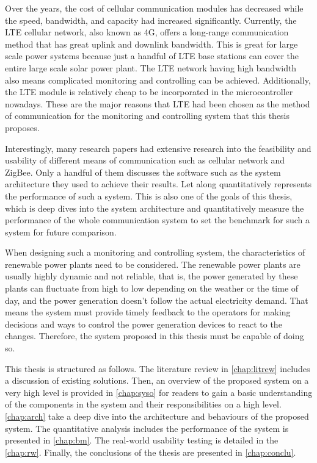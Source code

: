 \documentclass[../thesis.tex]{subfiles}
\begin{document}
Over the years, the cost of cellular communication modules has decreased while the speed, bandwidth, and capacity had increased significantly\cite{CellGenComp}. Currently, the LTE cellular network, also known as 4G, offers a long-range communication method that has great uplink and downlink bandwidth. This is great for large scale power systems because just a handful of LTE base stations can cover the entire large scale solar power plant. The LTE network having high bandwidth also means complicated monitoring and controlling can be achieved. Additionally, the LTE module is relatively cheap to be incorporated in the microcontroller nowadays. These are the major reasons that LTE had been chosen as the method of communication for the monitoring and controlling system that this thesis proposes.

Interestingly, many research papers had extensive research into the feasibility and usability of different means of communication such as cellular network and ZigBee. Only a handful of them discusses the software such as the system architecture they used to achieve their results. Let along quantitatively represents the performance of such a system. This is also one of the goals of this thesis, which is deep dives into the system architecture and quantitatively measure the performance of the whole communication system to set the benchmark for such a system for future comparison.

When designing such a monitoring and controlling system, the characteristics of renewable power plants need to be considered. The renewable power plants are usually highly dynamic and not reliable, that is, the power generated by these plants can fluctuate from high to low depending on the weather or the time of day, and the power generation doesn't follow the actual electricity demand. That means the system must provide timely feedback to the operators for making decisions and ways to control the power generation devices to react to the changes. Therefore, the system proposed in this thesis must be capable of doing so.

This thesis is structured as follows. The literature review in \autoref{chap:litrew} includes a discussion of existing solutions. Then, an overview of the proposed system on a very high level is provided in \autoref{chap:syso} for readers to gain a basic understanding of the components in the system and their responsibilities on a high level. \autoref{chap:arch} take a deep dive into the architecture and behaviours of the proposed system. The quantitative analysis includes the performance of the system is presented in \autoref{chap:bm}. The real-world usability testing is detailed in the \autoref{chap:rw}. Finally, the conclusions of the thesis are presented in \autoref{chap:conclu}.
\end{document}
